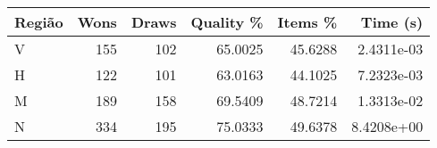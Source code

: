 \begin{tabular}{lrrrrr}
    \hline
    Região & Wons & Draws & Quality \% & Items \% & Time (s)   \\
    \hline
    V      & 155  & 102   & 65.0025    & 45.6288  & 2.4311e-03 \\
    H      & 122  & 101   & 63.0163    & 44.1025  & 7.2323e-03 \\
    M      & 189  & 158   & 69.5409    & 48.7214  & 1.3313e-02 \\
    N      & 334  & 195   & 75.0333    & 49.6378  & 8.4208e+00 \\
    \hline
\end{tabular}